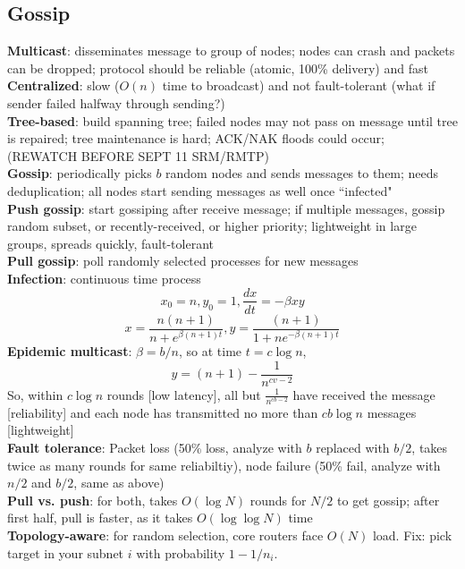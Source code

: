 \documentclass{article}
\begin{document}
\begin{multicols*}{3}
\section{Gossip}
\textbf{Multicast}: disseminates message to group of nodes; nodes can crash and packets can be dropped; protocol should be reliable (atomic, 100\% delivery) and fast \\
\textbf{Centralized}: slow ($O(n)$ time to broadcast) and not fault-tolerant (what if sender failed halfway through sending?) \\
\textbf{Tree-based}: build spanning tree; failed nodes may not pass on message until tree is repaired; tree maintenance is hard; ACK/NAK floods could occur; (REWATCH BEFORE SEPT 11 SRM/RMTP) \\
\textbf{Gossip}: periodically picks $b$ random nodes and sends messages to them; needs deduplication; all nodes start sending messages as well once ``infected" \\
\textbf{Push gossip}: start gossiping after receive message; if multiple messages, gossip random subset, or recently-received, or higher priority; lightweight in large groups, spreads quickly, fault-tolerant \\
\textbf{Pull gossip}: poll randomly selected processes for new messages \\
\textbf{Infection}: continuous time process
$$x_0 = n, y_0 = 1, \dfrac{dx}{dt} = -\beta x y$$
$$x = \dfrac{n(n+1)}{n+e^{\beta(n+1)t}}, y = \dfrac{(n+1)}{1 + ne^{-\beta(n+1)t}}$$
\textbf{Epidemic multicast}: $\beta = b/n$, so at time $t=c\log{n}$,
$$y = (n+1) - \dfrac{1}{n^{cv-2}}$$
So, within $c\log{n}$ rounds [low latency], all but $\frac{1}{n^{cb-2}}$ have received the message [reliability] and each node has transmitted no more than $cb\log{n}$ messages [lightweight] \\
\textbf{Fault tolerance}: Packet loss (50\% loss, analyze with $b$ replaced with $b/2$, takes twice as many rounds for same reliabiltiy), node failure (50\% fail, analyze with $n/2$ and $b/2$, same as above) \\
\textbf{Pull vs. push}: for both, takes $O(\log{N})$ rounds for $N/2$ to get gossip; after first half, pull is faster, as it takes $O(\log{\log{N}})$ time \\
\textbf{Topology-aware}: for random selection, core routers face $O(N)$ load. Fix: pick target in your subnet $i$ with probability $1-1/n_i$.


\end{multicols*}
\end{document}
